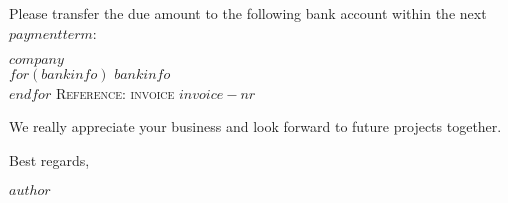 \documentclass[12, a4paper]{article}
\begin{document}
\vspace{10mm}

\sffamily
\small
  Please transfer the due amount to the following bank account within the next $paymentterm$:

\textsc{\textbf{$company$}}\\
$for(bankinfo)$
\textsc{$bankinfo$}\\
$endfor$
\textsc{Reference: invoice $invoice-nr$}

\vspace{10mm}


  We really appreciate your business and look forward to future projects together.

  Best regards,

\medskip

$author$
\end{document}
